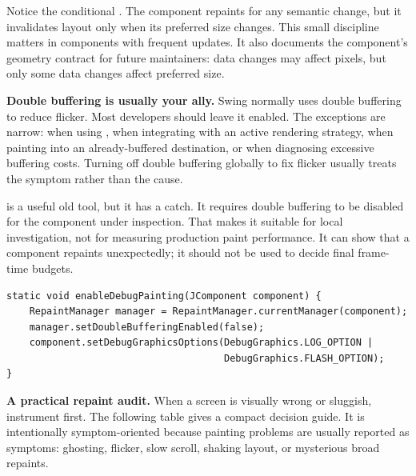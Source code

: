 Notice the conditional . The component repaints for any semantic change, but it invalidates layout only when its preferred size changes. This small discipline matters in components with frequent updates. It also documents the component's geometry contract for future maintainers: data changes may affect pixels, but only some data changes affect preferred size.

\textbf{Double buffering is usually your ally.} Swing normally uses double buffering to reduce flicker. Most developers should leave it enabled. The exceptions are narrow: when using , when integrating with an active rendering strategy, when painting into an already-buffered destination, or when diagnosing excessive buffering costs. Turning off double buffering globally to fix flicker usually treats the symptom rather than the cause.

 is a useful old tool, but it has a catch. It requires double buffering to be disabled for the component under inspection. That makes it suitable for local investigation, not for measuring production paint performance. It can show that a component repaints unexpectedly; it should not be used to decide final frame-time budgets.

\begin{lstlisting}[caption={Using DebugGraphics in a controlled diagnostic experiment.}]
static void enableDebugPainting(JComponent component) {
    RepaintManager manager = RepaintManager.currentManager(component);
    manager.setDoubleBufferingEnabled(false);
    component.setDebugGraphicsOptions(DebugGraphics.LOG_OPTION |
                                      DebugGraphics.FLASH_OPTION);
}
\end{lstlisting}

\textbf{A practical repaint audit.} When a screen is visually wrong or sluggish, instrument first. The following table gives a compact decision guide. It is intentionally symptom-oriented because painting problems are usually reported as symptoms: ghosting, flicker, slow scroll, shaking layout, or mysterious broad repaints.

